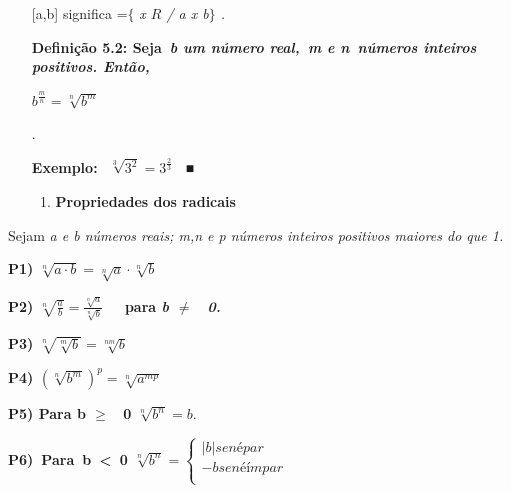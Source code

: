 \documentclass[12pt]{article}
\renewcommand{\_}{\kern-1.5pt\textunderscore\kern-1.5pt}
\begin{document}
\begin{enumerate}[label*={\fontsize{12pt}{12pt}\selectfont \textbf{\arabic*.}}]
[a,b] significa =$ \{ $ \textit{ x   \( R \)  / a  x  b$ \} $ .}\par


\vspace{\baselineskip}
\textbf{Definição 5.2: Seja\  \textit{b um número real,\  m e n\ números inteiros positivos.  Então,}}\par


\vspace{\baselineskip}
\tab   \( b^{\frac{m}{n}}=\sqrt[n]{b^{m}} \) {\fontsize{14pt}{16.8pt}\selectfont .\par}\par

\textbf{Exemplo: \( ~~\sqrt[3]{3^{2}}=3^{\frac{2}{3}} \) \  ■}\par


\vspace{\baselineskip}
\begin{enumerate}[label*=\textbf{\arabic*.}]
	\item \textbf{Propriedades dos radicais}
\end{enumerate}
\end{enumerate}\par

Sejam \textit{a e b números reais; m,n e p números inteiros positivos maiores do que 1.}\par

\textbf{P1)  \( \sqrt[n]{a \cdot b}=\sqrt[n]{a} \cdot \sqrt[n]{b} \) }\par

\textbf{P2)  \( \sqrt[n]{\frac{a}{b}}=\frac{\sqrt[n]{a}}{\sqrt[n]{b}} \) \ \ para  \textit{b $ \neq $ \  0.}}\par

\textbf{P3)  \( \sqrt[n]{\sqrt[m]{b}}=\sqrt[nm]{b} \) }\par

\textbf{P4)  \(  \left( \sqrt[n]{b^{m}} \right) ^{p}=\sqrt[n]{a^{mp}} \) }\par

\textbf{P5) Para b $ \geq $ \ 0    \( \sqrt[n]{b^{n}}=b . \) }\par

\textbf{P6)\ Para\ b\ <\ 0       \( \sqrt[n]{b^{n}}= \left\{ \begin{matrix}
 \vert b \vert  se n é par\\
-b se n é ímpar\\
\end{matrix}
 ~ \) }\par
\end{document}
